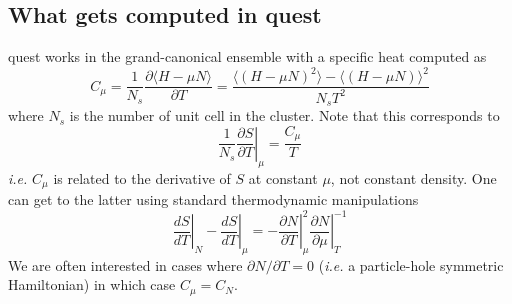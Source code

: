 \documentclass{revtex4}
\begin{document}
\subsection*{What gets computed in {\sc quest}}

{\sc quest} works in the grand-canonical ensemble with a specific heat computed as
\begin{equation}
C_\mu = \frac{1}{N_s}\frac{\partial\langle H - \mu N \rangle}{\partial T} = \frac{\langle (H - \mu N)^2 \rangle-\langle (H - \mu N) \rangle^2}{N_s T^2}
\end{equation}
where $N_s$ is the number of unit cell in the cluster.
Note that this corresponds to
\begin{equation}
\frac{1}{N_s}\left.\frac{\partial S}{\partial T}\right|_{\mu} = \frac{C_\mu}{T}
\end{equation}
{\em i.e.} $C_\mu$ is related to the derivative of $S$ at constant $\mu$, not constant density.
One can get to the latter using standard thermodynamic manipulations
\begin{equation}
\left.\frac{d S}{dT}\right|_{N} - \left.\frac{d S}{dT}\right|_{\mu} = 
-\left.\frac{\partial N}{\partial T}\right|_{\mu}^2
\left.\frac{\partial N}{\partial \mu}\right|_{T}^{-1}
\end{equation}
We are often interested in cases where $\partial N /\partial T =0$ ({\em i.e.} a particle-hole
symmetric Hamiltonian) in which case $C_\mu = C_N$.
\end{document}

